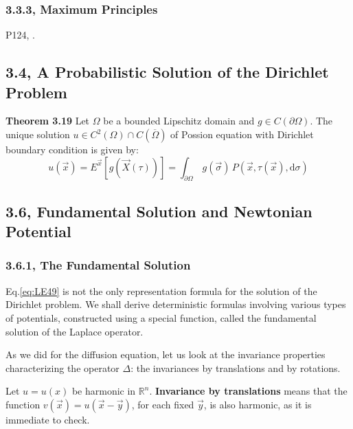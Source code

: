 \documentclass[../main.tex]{subfiles}
\begin{document}
\subsubsection{3.3.3, Maximum Principles}

P124, \cite{salsa2016partial}.

\subsection{3.4, A Probabilistic Solution of the Dirichlet Problem}

\textbf{Theorem 3.19}  Let $\Omega$ be a bounded Lipschitz domain and $g \in C(\partial \Omega)$. The unique solution $u \in C^2(\Omega) \cap C(\overline{\Omega})$ of Possion equation with Dirichlet boundary condition is given by:
\begin{equation} \label{eq:LE49}
    u(\vec{x}) = E^{\vec{x}}[g(\vec{X}(\tau))] = \int_{\partial \Omega} \, g(\vec{\sigma}) \, P(\vec{x}, \tau(\vec{x}), \mathrm{d} \sigma)
\end{equation}

\subsection{3.6, Fundamental Solution and Newtonian Potential}

\subsubsection{3.6.1, The Fundamental Solution}

Eq.\ref{eq:LE49} is not the only representation formula for the solution of the Dirichlet problem. We shall derive deterministic formulas involving various types of potentials, constructed using a special function, called the fundamental solution of the Laplace operator.

As we did for the diffusion equation, let us look at the invariance properties characterizing the operator $\Delta$: the invariances by translations and by rotations.

Let $u = u(x)$ be harmonic in $\mathbb{R}^n$. \textbf{Invariance by translations} means that the function $v (\vec{x}) = u (\vec{x} - \vec{y})$, for each fixed $\vec{y}$, is also harmonic, as it is immediate to check.
\end{document}
